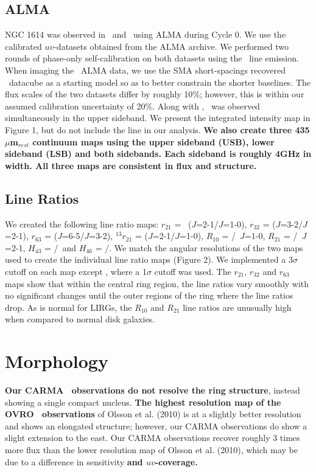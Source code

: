 \subsection{ALMA}

NGC 1614 was observed in \cothree\ and \cosix\ using ALMA during Cycle 0.  We use the calibrated $uv$-datasets obtained from the ALMA archive. We performed two rounds of phase-only self-calibration on both datasets using the \co\ line emission. When imaging the \cothree\ ALMA data, we use the SMA short-spacings recovered \cothree\ datacube as a starting model so as to better constrain the shorter baselines.  The flux scales of the two datasets differ by roughly 10$\%$; however, this is within our assumed calibration uncertainty of 20$\%$. Along with \cothree, \hcofour\ was observed simultaneously in the upper sideband. We present the integrated intensity map in Figure 1, but do not include the line in our analysis. \textbf{We also create three 435$\mu$m$_{rest}$ continuum maps using the upper sideband (USB), lower sideband (LSB) and both sidebands. Each sideband is roughly 4GHz in width. All three maps are consistent in flux and structure. }
\subsection{Line Ratios}

We created the following line ratio maps: $r_{21}$ = \co\ ($J$=2-1/$J$=1-0),
$r_{32}$ = \co($J$=3-2/$J$=2-1),
$r_{63}$ = \co ($J$=6-5/$J$=3-2),
$^{13}r_{21}$ = \tco ($J$=2-1/$J$=1-0),
$R_{10}$ = \co/\tco\ $J$=1-0,
$R_{21}$ = \co/\tco\ $J$=2-1,
$H_{43}$ = \hcofour/\cothree\ and
$H_{46}$ = \hcofour/\cosix.
We match the angular resolutions of the two maps used to create the individual line ratio maps (Figure 2). We implemented a 3$\sigma$ cutoff on each map except \tcotwo, where a 1$\sigma$ cutoff was used. The  $r_{21}$, $r_{32}$ and $r_{63}$ maps show that within the central ring region, the line ratios vary smoothly with no significant changes until the outer regions of the ring where the line ratios drop. As is normal for LIRGs, the $R_{10}$ and $R_{21}$ line ratios are unusually high when compared to normal disk galaxies. 


\section{Morphology}

\textbf{Our CARMA \coone\ observations do not resolve the ring structure}, instead showing a single compact nucleus. \textbf{The highest resolution map of the OVRO \coone\ observations} of Olsson et al. (2010) is at a slightly better resolution and shows an elongated structure; however, our CARMA observations do show a slight extension to the east. Our CARMA observations recover roughly 3 times more flux than the lower resolution map of Olsson et al. (2010), which may be due to a difference in sensitivity \textbf{and $uv$-coverage.}

